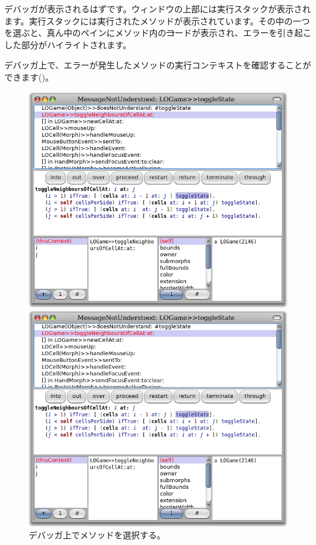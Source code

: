 \documentclass[a4paper,10pt,twoside]{book}
\begin{document}

デバッガが表示されるはずです。ウィンドウの上部には実行スタックが表示されます。実行スタックには実行されたメソッドが表示されています。その中の一つを選ぶと、真ん中のペインにメソッド内の\st コードが表示され、エラーを引き起こした部分がハイライトされます。


デバッガ上で、エラーが発生したメソッドの実行コンテキストを確認することができます()。

\begin{figure}[ht]
\ifluluelse
	{\centerline {\includegraphics[width=\textwidth]{Debugger}}}
	{\centerline {\includegraphics[scale=0.7]{Debugger}}}
\caption{デバッガ上でメソッドを選択する。
}
\end{figure}
\end{document}
